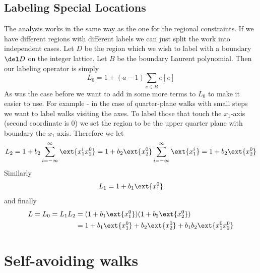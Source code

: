 \subsection{Labeling Special Locations}
The analysis works in the same way as the one for the regional constraints. If we have different regions with different labels we can just split the work into independent cases. Let $D$ be the region which we wish to label with a boundary $\del D$ on the integer lattice. Let $B$ be the boundary Laurent polynomial. Then our labeling operator is simply
\[
	L_0 = 1 + (a-1)\sum_{e \in B} e[e]
\]
As was the case before we want to add in some more terms to $L_0$ to make it easier to use. For example - in the case of quarter-plane walks with small steps we want to label walks visiting the axes. To label those that touch the $x_1$-axis (second coordinate is 0) we set the region to be the upper quarter plane with boundary the $x_1$-axis. Therefore we let
\[
	L_2 = 1 + b_2\sum_{i=-\infty}^\infty \ext{x_1^ix_2^0} = 1 + b_2 \ext{x_2^0}\sum_{i=-\infty}^\infty \ext{x_1^i} = 1 + b_2\ext{x_2^0}
\]
Similarly
\[
	L_1 = 1+ b_1\ext{x_1^0}
\]
and finally
\begin{align*}
	L = L_0 = L_1L_2 &= (1+ b_1\ext{x_1^0}) (1+ b_2\ext{x_2^0})\\
	&= 1 + b_1\ext{x_1^0}+b_2\ext{x_2^0}+b_1b_2\ext{x_1^0x_2^0}
\end{align*}

\section{Self-avoiding walks}
\label{sec:SAWs}

